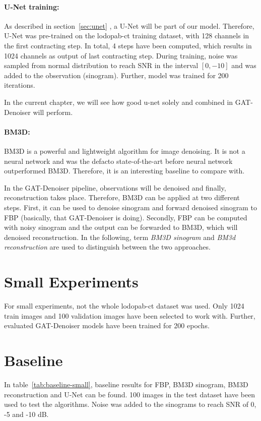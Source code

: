 \paragraph{U-Net training:}
As described in section~\ref{sec:unet} , a U-Net will be part of our model.
Therefore, U-Net was pre-trained on the lodopab-ct training dataset, with 128 channels in the first contracting step. 
In total, 4 steps have been computed, which results in 1024 channels as output of last contracting step.
During training, noise was sampled from normal distribution to reach SNR in the interval $[0, -10]$ and was added to the observation (sinogram). 
Further, model was trained for 200 iterations.

In the current chapter, we will see how good u-net solely and combined in GAT-Denoiser will perform.

\paragraph{BM3D:}
BM3D is a powerful and lightweight algorithm for image denoising. 
It is not a neural network and was the defacto state-of-the-art before neural network outperformed
BM3D. Therefore, it is an interesting baseline to compare with.

In the GAT-Denoiser pipeline, observations will be denoised and finally, reconstruction takes place.
Therefore, BM3D can be applied at two different steps. First, it can be used to denoise sinogram
and forward denoised sinogram to FBP (basically, that GAT-Denoiser is doing). Secondly, FBP can be
computed with noisy sinogram and the output can be forwarded to BM3D, which will denoised reconstruction.
In the following, term \textit{BM3D sinogram} and \textit{BM3d reconstruction} 
are used to distinguish between the two approaches.


\section{Small Experiments}
For small experiments, not the whole lodopab-ct dataset was used. Only 1024 train images
and 100 validation images have been selected to work with. 
Further, evaluated GAT-Denoiser models have been trained for 200 epochs.

\section{Baseline}

In table~\ref{tab:baseline-small}, baseline results for FBP, BM3D sinogram, BM3D reconstruction and U-Net can be found.
100 images in the test dataset have been used to test the algorithms. Noise was added to the sinograms to reach SNR of 0, -5 and -10 dB.

